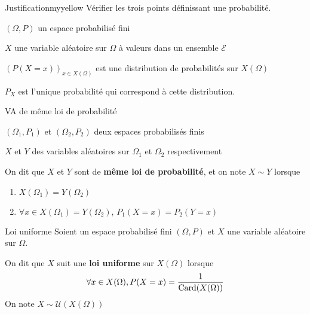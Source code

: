     \begin{demo}{Justification}{myyellow}
        Vérifier les trois points définissant une probabilité.
    \end{demo}

    \begin{theo}{}{}
        \begin{soient}
            \item $(\Omega,P)$ un espace probabilisé fini
            \item $X$ une variable aléatoire sur $\Omega$ à valeurs dans un ensemble $\mathcal{E}$
        \end{soient}
        \begin{alors}
            \item $\left(P(X=x)\right)_{x \in X(\Omega)}$ est une distribution de probabilités sur $X(\Omega)$
            \item $P_X$ est l’unique probabilité qui correspond à cette distribution.
        \end{alors}
    \end{theo}

    \begin{defi}{VA de même loi de probabilité}{}
        \begin{soient}
            \item $(\Omega_1,P_1)$ et $(\Omega_2,P_2)$ deux espaces probabilisés finis
            \item $X$ et $Y$ des variables aléatoires sur $\Omega_1$ et $\Omega_2$ respectivement
        \end{soient}
        On dit que $X$ et $Y$ sont de \textbf{même loi de probabilité}, et on note $X \sim Y$ lorsque 
        \begin{enumerate}
            \item $X(\Omega_1) = Y(\Omega_2)$
            \item $\forall x \in X(\Omega_1) = Y(\Omega_2), \, P_1(X=x) = P_2(Y=x)$
        \end{enumerate}
    \end{defi}

    \begin{defi}{Loi uniforme}{}
        Soient un espace probabilisé fini $(\Omega,P)$ et $X$ une variable aléatoire sur $\Omega$.
    
        On dit que $X$ suit une \textbf{loi uniforme} sur $X(\Omega)$ lorsque 
        \[ \forall x \in X(\Omega), P(X = x) = \frac{1}{\operatorname{Card}(X(\Omega))} \]
        On note $X \sim \mathcal{U}(X(\Omega))$
    \end{defi}

